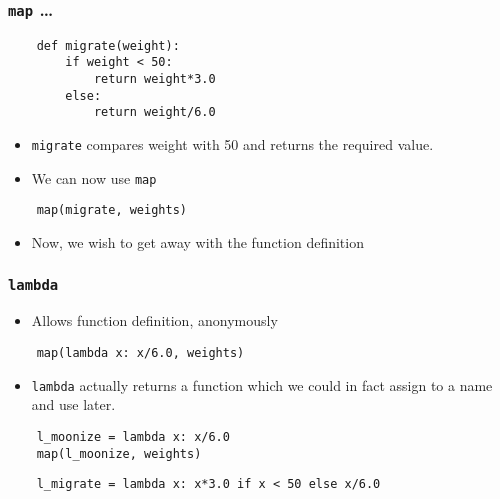 \begin{frame}[fragile]
  \frametitle{\texttt{map} \ldots}
  \begin{lstlisting}
    def migrate(weight):
        if weight < 50:
            return weight*3.0
        else:
            return weight/6.0
  \end{lstlisting}

  \begin{itemize}
  \item \texttt{migrate} compares weight with 50 and returns the
    required value.
  \item We can now use \texttt{map}
  \end{itemize}
  \begin{lstlisting}
    map(migrate, weights)
  \end{lstlisting}
  \begin{itemize}
  \item Now, we wish to get away with the function definition
  \end{itemize}
\end{frame}

\begin{frame}[fragile]
  \frametitle{\texttt{lambda}}
  \begin{itemize}
  \item Allows function definition, anonymously
  \end{itemize}
  \begin{lstlisting}
    map(lambda x: x/6.0, weights)
  \end{lstlisting}
  \begin{itemize}
  \item \texttt{lambda} actually returns a function which we could in
    fact assign to a name and use later.
  \end{itemize}
  \begin{lstlisting}
    l_moonize = lambda x: x/6.0
    map(l_moonize, weights)
  \end{lstlisting}
  \begin{lstlisting}
    l_migrate = lambda x: x*3.0 if x < 50 else x/6.0
  \end{lstlisting}
\end{frame}

